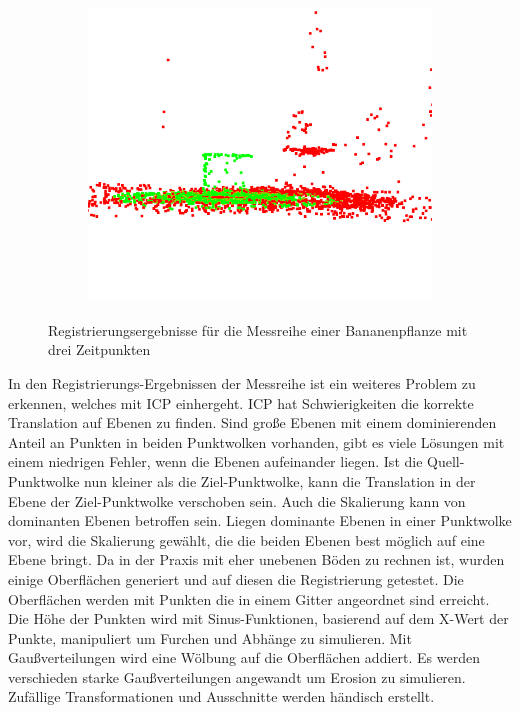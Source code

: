 \documentclass[12pt,titlepage, twoside]{article}
\begin{document}
\begin{figure}[htb]
\begin{subfigure}{0.3\textwidth}
  \includegraphics[width=\linewidth]{./Images/RegistrationBananaT3.png}
  \label{fig:registration:banana:3}
\end{subfigure}
\caption{Registrierungsergebnisse für die Messreihe einer Bananenpflanze mit drei Zeitpunkten}
\label{fig:registration:banana}
\end{figure}

In den Registrierungs-Ergebnissen der Messreihe ist ein weiteres Problem zu erkennen, welches mit ICP einhergeht. 
ICP hat Schwierigkeiten die korrekte Translation auf Ebenen zu finden. Sind große Ebenen mit einem dominierenden Anteil an Punkten in beiden Punktwolken vorhanden, 
 gibt es viele Lösungen mit einem niedrigen Fehler, wenn die Ebenen aufeinander liegen. Ist die Quell-Punktwolke nun kleiner als die Ziel-Punktwolke, kann die Translation in der Ebene der Ziel-Punktwolke verschoben sein.
Auch die Skalierung kann von dominanten Ebenen betroffen sein. Liegen dominante Ebenen in einer Punktwolke vor, wird die Skalierung gewählt, die die beiden Ebenen best möglich auf eine Ebene bringt.
Da in der Praxis mit eher unebenen Böden zu rechnen ist, wurden einige Oberflächen generiert und auf diesen die Registrierung getestet. 
Die Oberflächen werden mit Punkten die in einem Gitter angeordnet sind erreicht. Die Höhe der Punkten wird mit Sinus-Funktionen, basierend auf dem X-Wert der Punkte, manipuliert um Furchen und Abhänge zu simulieren. 
Mit Gaußverteilungen wird eine Wölbung auf die Oberflächen addiert. Es werden verschieden starke Gaußverteilungen angewandt um Erosion zu simulieren.
Zufällige Transformationen und Ausschnitte werden händisch erstellt.
\end{document}
